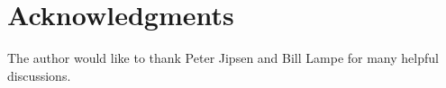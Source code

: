 \section*{Acknowledgments}
The author would like to thank Peter Jipsen
and Bill Lampe for many helpful discussions.



\printbibliography
























